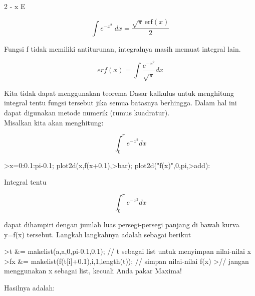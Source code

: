 \documentclass[a4paper,10pt]{article}
\begin{document}
\begin{eulernotebook}
\begin{eulercomment}
\begin{eulercomment}
\begin{eulercomment}
\begin{eulercomment}
\begin{eulercomment}
\begin{eulercomment}
\begin{eulercomment}
\begin{eulercomment}
\begin{eulercomment}
\begin{eulercomment}
\begin{euleroutput}
                                      2
                                   - x
                                  E
  
\end{euleroutput}
\begin{eulerformula}
\[
\int {e^ {- x^2 }}{\;dx}=\frac{\sqrt{\pi}\,\mathrm{erf}\left(x
 \right)}{2}
\]
\end{eulerformula}
\begin{eulercomment}
Fungsi f tidak memiliki antiturunan, integralnya masih memuat integral
lain.

\end{eulercomment}
\begin{eulerformula}
\[
erf(x)=\int \frac{e^{-x^2}}{\sqrt{\pi}}dx
\]
\end{eulerformula}
\begin{eulercomment}
Kita tidak dapat menggunakan teorema Dasar kalkulus untuk menghitung
integral tentu fungsi tersebut jika semua batasnya berhingga. Dalam
hal ini dapat digunakan metode numerik (rumus kuadratur).\\
Misalkan kita akan menghitung:

\end{eulercomment}
\begin{eulerformula}
\[
\int_{0}^{\pi}e^{-x^2}dx
\]
\end{eulerformula}
\begin{eulerprompt}
>x=0:0.1:pi-0.1; plot2d(x,f(x+0.1),>bar); plot2d("f(x)",0,pi,>add):
\end{eulerprompt}
\begin{eulercomment}
Integral tentu

\end{eulercomment}
\begin{eulerformula}
\[
\int_{0}^{\pi}e^{-x^2}dx
\]
\end{eulerformula}
\begin{eulercomment}
dapat dihampiri dengan jumlah luas persegi-persegi panjang di bawah
kurva y=f(x) tersebut. Langkahlangkahnya adalah sebagai berikut
\end{eulercomment}
\begin{eulerprompt}
>t &= makelist(a,a,0,pi-0.1,0.1); // t sebagai list untuk menyimpan nilai-nilai x
>fx &= makelist(f(t[i]+0.1),i,1,length(t)); // simpan nilai-nilai f(x)
>// jangan menggunakan x sebagai list, kecuali Anda pakar Maxima!
\end{eulerprompt}
\begin{eulercomment}
Hasilnya adalah:


\end{eulercomment}
\end{eulercomment}
\end{eulercomment}
\end{eulercomment}
\end{eulercomment}
\end{eulercomment}
\end{eulercomment}
\end{eulercomment}
\end{eulercomment}
\end{eulercomment}
\end{eulercomment}
\end{eulernotebook}
\end{document}
